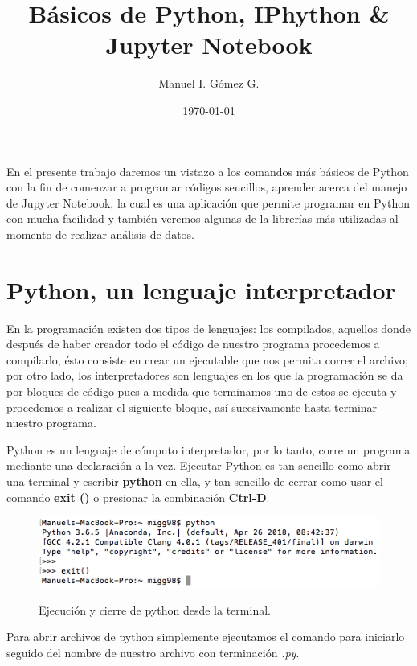 \documentclass[a4paper]{article}
\title{\textbf{Básicos de Python, IPhython \& Jupyter Notebook}}
\author{Manuel I. Gómez G.}
\date{\today}
\begin{document}
\maketitle

\begin{center}
\textbf{\abstractname{}}
\end{center}

En el presente trabajo daremos un vistazo a los comandos más básicos de Python con la fin de comenzar a programar códigos sencillos, aprender acerca del manejo de Jupyter Notebook, la cual es una aplicación que permite programar en Python con mucha facilidad y también veremos algunas de la librerías más utilizadas al momento de realizar análisis de datos.

\section{Python, un lenguaje interpretador}
\label{sec:introduction}

En la programación existen dos tipos de lenguajes: los compilados, aquellos donde después de haber creador todo el código de nuestro programa procedemos a compilarlo, ésto consiste en crear un ejecutable que nos permita correr el archivo; por otro lado, los interpretadores son lenguajes en los que la programación se da por bloques de código pues a medida que terminamos uno de estos se ejecuta y procedemos a realizar el siguiente bloque, así sucesivamente hasta terminar nuestro programa.

Python es un lenguaje de cómputo interpretador, por lo tanto, corre un programa mediante una declaración a la vez. Ejecutar Python es tan sencillo como abrir una terminal y escribir \textbf{python} en ella, y tan sencillo de cerrar como usar el comando \textbf{exit ()} o presionar la combinación \textbf{Ctrl-D}.

\begin{figure}[h!]
	\centering
    \includegraphics[width=12cm]{./Images/Terminal}
    \label{Terminal}
    \caption{Ejecución y cierre de python desde la terminal.}
\end{figure}

Para abrir archivos de python simplemente ejecutamos el comando para iniciarlo seguido del nombre de nuestro archivo con terminación \textit{.py}.
\end{document}
